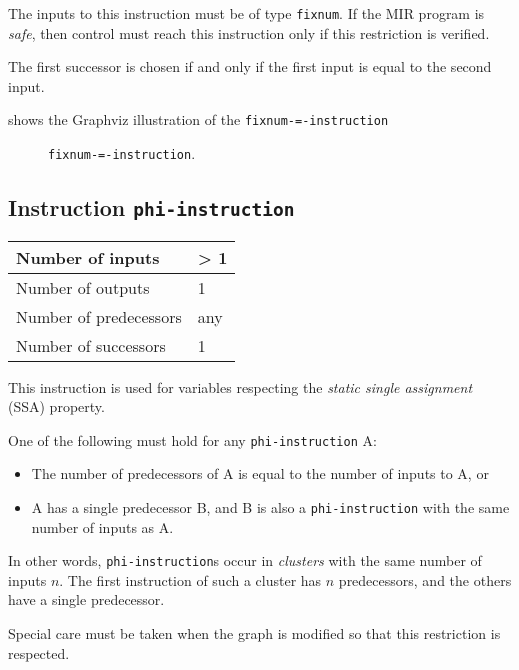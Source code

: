 The inputs to this instruction must be of type \texttt{fixnum}.  If the
MIR program is \emph{safe}, then control must reach this instruction
only if this restriction is verified.

The first successor is chosen if and only if the first input is equal
to the second input.

 shows the Graphviz illustration of the
\texttt{fixnum-=-instruction}

\begin{figure}
\begin{center}
\end{center}
\caption{\label{fig-fixnum-equal-instruction}
\texttt{fixnum-=-instruction}.}
\end{figure}

\subsection{Instruction \texttt{phi-instruction}}
\label{mir-instruction-phi}

\begin{tabular}{|l|l|}
\hline
Number of inputs & > 1\\
\hline
Number of outputs & 1\\
\hline
Number of predecessors & any\\
\hline
Number of successors & 1\\
\hline
\end{tabular}

This instruction is used for variables respecting the \emph{static
  single assignment} (SSA) property.  

One of the following must hold for any \texttt{phi-instruction} A:

\begin{itemize}
\item The number of predecessors of A is equal to the number of inputs
  to A, or
\item A has a single predecessor B, and B is also a
  \texttt{phi-instruction} with the same number of inputs as A.
\end{itemize}

In other words, \texttt{phi-instruction}s occur in \emph{clusters}
with the same number of inputs $n$.  The first instruction of such a
cluster has $n$ predecessors, and the others have a single
predecessor. 

Special care must be taken when the graph is modified so that this
restriction is respected. 


